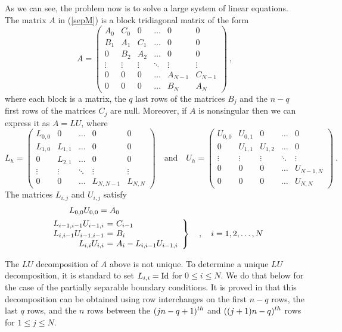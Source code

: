 As we can see, the problem now is to solve a large system of linear
equations.  The matrix $A$ in (\ref{sepM}) is a block tridiagonal matrix
of the form
\[
A = \begin{pmatrix}
A_0 & C_0 & 0 &  \ldots & 0 & 0 \\
B_1 & A_1 & C_1 & \ldots & 0 & 0 \\
0 & B_2 & A_2 & \ldots & 0 & 0 \\
\vdots & \vdots & \vdots & \ddots & \vdots & \vdots \\
0 & 0 & 0 & \ldots & A_{N-1} & C_{N-1} \\
0 & 0 & 0 & \ldots & B_N & A_N
\end{pmatrix} \ ,
\]
where each block is a \nn matrix, the $q$ last rows of the \nn
matrices $B_j$ and the $n-q$ first rows of the \nn matrices
$C_j$ are null.  Moreover, if $A$ is nonsingular then we can express
it as $A = L U$, where
\[
L_h = \begin{pmatrix}
L_{0,0} & 0 & \ldots & 0 & 0 \\
L_{1,0} & L_{1,1} & \ldots & 0 & 0 \\
0 & L_{2,1} &  \ldots & 0 & 0 \\
\vdots & \vdots & \ddots & \vdots & \vdots \\
0 & 0 & \ldots & L_{N,N-1} & L_{N,N}
\end{pmatrix}
\quad \text{and} \quad
U_h = \begin{pmatrix}
U_{0,0} & U_{0,1} & 0 & \ldots & 0 \\
0 & U_{1,1} & U_{1,2} & \ldots & 0 \\
\vdots & \vdots & \vdots & \ddots & \vdots \\
0 & 0 & 0 & \ldots & U_{N-1,N} \\
0 & 0 & 0 & \ldots &  U_{N,N}
\end{pmatrix} \ .
\]
The \nn matrices $L_{i,j}$ and $U_{i,j}$ satisfy
\begin{align*}
&\hspace{2.7em}  L_{0,0} U_{0,0} = A_0 \\
& \left.
\begin{array}{r@{\ =\ }l}
L_{i-1,i-1} U_{i-1,i} & C_{i-1} \\
L_{i,i-1} U_{i-1,i-1} & B_i \\
L_{i,i} U_{i,i} & A_i - L_{i,i-1} U_{i-1,i} 
\end{array} 
\right\} \quad , \quad i=1, 2, \ldots, N
\end{align*}

The $LU$ decomposition of $A$ above is not unique.  To determine a
unique $LU$ decomposition, it is standard to set $L_{i,i} = \operatorname{Id}$ for
$0\leq i \leq N$.  We do that below for the case of the partially
separable boundary conditions.  It is proved in \cite{K} that
this decomposition can be obtained using row interchanges on the first
$n-q$ rows, the last $q$ rows, and the $n$ rows between the
$\displaystyle (jn-q+1)^{th}$ and $\displaystyle ((j+1)n-q)^{th}$ rows
for $1\leq j\leq N$.

